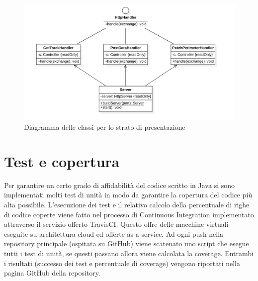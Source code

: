 \begin{figure}
    \centering
    \includegraphics[width=\textwidth]{immagini/presentation_classes.png}
    \caption{Diagramma delle classi per lo strato di presentazione}
    \label{fig:class_diagram_presentation}
\end{figure}

\section{Test e copertura}
Per garantire un certo grado di affidabilità del codice scritto in Java si sono implementati molti test di unità in modo da garantire la copertura del codice più alta possibile. L'esecuzione dei test e il relativo calcolo della percentuale di righe di codice coperte viene fatto nel processo di Continuous Integration implementato attraverso il servizio offerto TravisCI. Questo offre delle macchine virtuali eseguite su architettura cloud ed offerte as-a-service. Ad ogni push nella repository principale (ospitata su GitHub) viene scatenato uno script che esegue tutti i test di unità, se questi passano allora viene calcolata la coverage. Entrambi i risultati (successo dei test e percentuale di coverage) vengono riportati nella pagina GitHub della repository.
